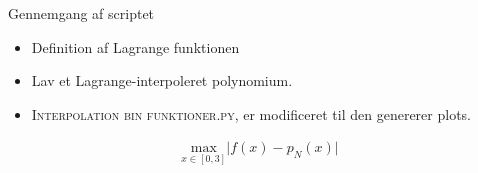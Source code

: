 
\begin{frame}{Gennemgang af scriptet}
    \begin{itemize}
        \item Definition af Lagrange funktionen
        \item Lav et Lagrange-interpoleret polynomium. 
        \item \textsc{Interpolation bin funktioner.py}, er  modificeret til den genererer plots. 
    \end{itemize}
    \begin{align*}
    \underset{x \in \left [0,3 \right ]}{\text{max}} \lvert f(x)-p_N(x) \rvert
    \end{align*}
\end{frame}

